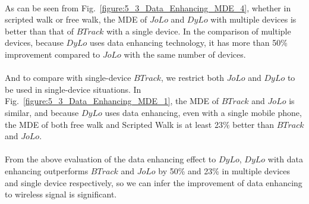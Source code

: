 \documentclass[a4paper,12pt]{report}
\begin{document}
\paragraph{}
As can be seen from Fig.~\ref{figure:5_3_Data_Enhancing_MDE_4}, whether in scripted walk or free walk, the MDE of $JoLo$ and $DyLo$ with multiple devices is better than that of $BTrack$ with a single device. In the comparison of multiple devices, because $DyLo$ uses data enhancing technology, it has more than 50\% improvement compared to $JoLo$ with the same number of devices.
%

\paragraph{}
And to compare with single-device $BTrack$, we restrict both $JoLo$ and $DyLo$ to be used in single-device situations. In Fig.~\ref{figure:5_3_Data_Enhancing_MDE_1}, the MDE of $BTrack$ and $JoLo$ is similar, and because $DyLo$ uses data enhancing, even with a single mobile phone, the MDE of both free walk and Scripted Walk is at least 23\% better than $BTrack$ and $JoLo$.
%

\paragraph{}
From the above evaluation of the data enhancing effect to $DyLo$, $DyLo$ with data enhancing outperforms $BTrack$ and $JoLo$ by 50\% and 23\% in multiple devices and single device respectively, so we can infer the improvement of data enhancing to wireless signal is significant.
%
\end{document}
